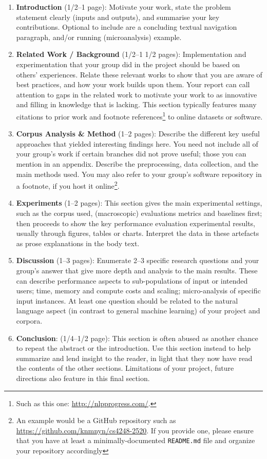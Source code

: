 \documentclass[11pt]{article}
\begin{document}
\begin{enumerate}
    \item {\bf Introduction} (1/2--1 page): Motivate your work, state the problem statement clearly (inputs and outputs), and summarise your key contributions.  Optional to include are a concluding textual navigation paragraph, and/or running (microanalysis) example. 
    \item {\bf Related Work / Background} (1/2--1 1/2 pages): Implementation and experimentation that your group did in the project should be based on others' experiences.  Relate these relevant works to show that you are aware of best practices, and how your work builds upon them.  Your report can call attention to gaps in the related work to motivate your work to as innovative and filling in knowledge that is lacking.  This section typically features many citations to prior work and footnote references\footnote{Such as this one: \url{http://nlpprogress.com/}.} to online datasets or software.
    \item {\bf Corpus Analysis \& Method} (1--2 pages): Describe the different key useful approaches that yielded interesting findings here.  You need not include all of your group's work if certain branches did not prove useful; those you can mention in an appendix.  Describe the preprocessing, data collection, and the main methods used. You may also refer to your group's software repository in a footnote, if you host it online\footnote{An example would be a GitHub repository such as \url{https://github.com/knmnyn/cs4248-2520}. If you provide one, please ensure that you have at least a minimally-documented {\tt README.md} file and organize your repository accordingly}. 
    \item {\bf Experiments} (1--2 pages): This section gives the main experimental settings, such as the corpus used, (macroscopic) evaluations metrics and baselines first; then proceeds to show the key performance evaluation experimental results, usually through figures, tables or charts.  Interpret the data in these artefacts as prose explanations in the body text.
    \item {\bf Discussion} (1--3 pages): Enumerate 2--3 specific research questions and your group's answer that give more depth and analysis to the main results.  These can describe performance aspects to sub-populations of input or intended users; time, memory and compute costs and scaling; micro-analysis of specific input instances.  At least one question should be related to the natural language aspect (in contrast to general machine learning) of your project and corpora.
    \item {\bf Conclusion}: (1/4--1/2 page): This section is often abused as another chance to repeat the abstract or the introduction.  Use this section instead to help summarize and lend insight to the reader, in light that they now have read the contents of the other sections.  Limitations of your project, future directions also feature in this final section.
\end{enumerate}
\end{document}
